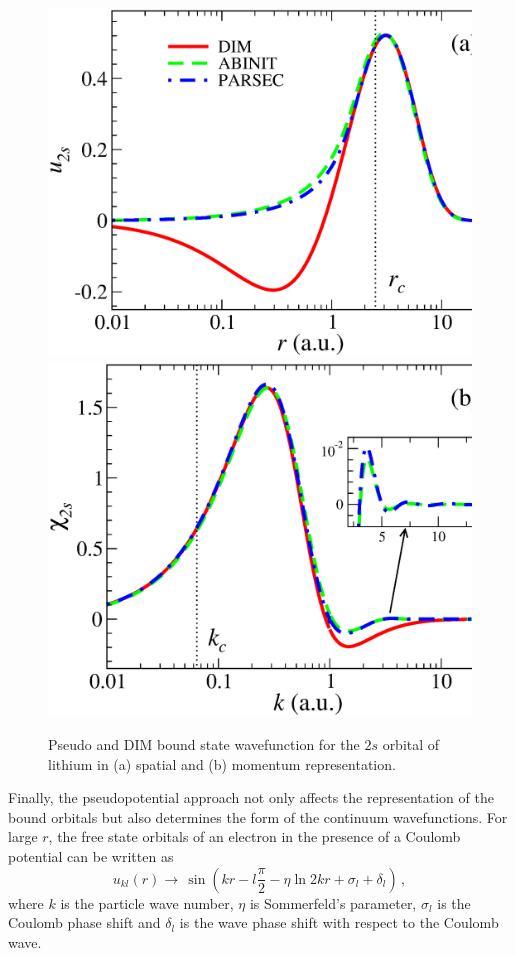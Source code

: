 \documentclass[10pt]{article}
\begin{document}
\begin{figure}[H]
\centering
 \includegraphics[height=0.23\textheight]{figures/pseudopot/funcLi.eps}
\hspace{0.2cm}
 \includegraphics[height=0.23\textheight]{figures/pseudopot/funckLi.eps}
 \caption{Pseudo and DIM bound state wavefunction for the $2s$ 
 orbital of lithium in (a) spatial and (b) momentum representation.}
 \label{fig:wavesLi}
\end{figure}

Finally, the pseudopotential approach not only affects the 
representation of the bound orbitals but also determines the form of 
the continuum wavefunctions. For large $r$, the free state orbitals 
of an electron in the presence of a Coulomb potential can be written 
as
\begin{equation}
 u_{kl}(r) \rightarrow \,\sin \left( kr - l\frac{\pi}{2} - \eta \ln 2kr +
 \sigma_l + \delta_l \right)\,,
\end{equation}
where $k$ is the particle wave number, $\eta$ is Sommerfeld's 
parameter, $\sigma_l$ is the Coulomb phase shift and $\delta_l$ is 
the wave phase shift with respect to the Coulomb wave.
\end{document}
